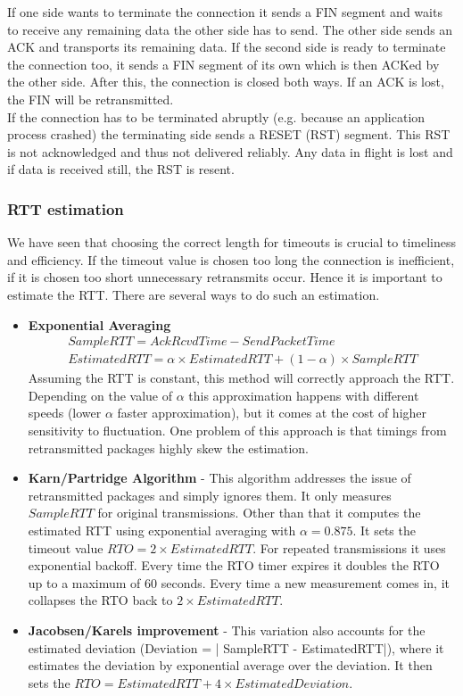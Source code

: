 If one side wants to terminate the connection it sends a FIN segment and waits to receive any remaining data the other side has to send. The other side sends an ACK and transports its remaining data. If the second side is ready to terminate the connection too, it sends a FIN segment of its own which is then ACKed by the other side. After this, the connection is closed both ways. If an ACK is lost, the FIN will be retransmitted.\\
If the connection has to be terminated abruptly (e.g. because an application process crashed) the terminating side sends a RESET (RST) segment. This RST is not acknowledged and thus not delivered reliably. Any data in flight is lost and if data is received still, the RST is resent.

\subsubsection{RTT estimation}
We have seen that choosing the correct length for timeouts is crucial to timeliness and efficiency. If the timeout value is chosen too long the connection is inefficient, if it is chosen too short unnecessary retransmits occur. Hence it is important to estimate the RTT. There are several ways to do such an estimation.
\begin{itemize}
\item \textbf{Exponential Averaging} 
\begin{align*}
SampleRTT = AckRcvdTime - SendPacketTime \\
EstimatedRTT = \alpha \times EstimatedRTT + (1-\alpha) \times SampleRTT
\end{align*}
Assuming the RTT is constant, this method will correctly approach the RTT. Depending on the value of $\alpha$ this approximation happens with different speeds (lower $\alpha$ faster approximation), but it comes at the cost of higher sensitivity to fluctuation. One problem of this approach is that timings from retransmitted packages highly skew the estimation.
\item \textbf{Karn/Partridge Algorithm} - This algorithm addresses the issue of retransmitted packages and simply ignores them. It only measures $SampleRTT$ for original transmissions. Other than that it computes the estimated RTT using exponential averaging with $\alpha = 0.875$. It sets the timeout value $RTO = 2 \times EstimatedRTT$. For repeated transmissions it uses exponential backoff. Every time the RTO timer expires it doubles the RTO up to a maximum of 60 seconds. Every time a new measurement comes in, it collapses the RTO back to $2 \times EstimatedRTT$.
\item \textbf{Jacobsen/Karels improvement} - This variation also accounts for the estimated deviation (Deviation = | SampleRTT - EstimatedRTT|), where it estimates the deviation by exponential average over the deviation. It then sets the $RTO = EstimatedRTT + 4 \times EstimatedDeviation$.
\end{itemize}

